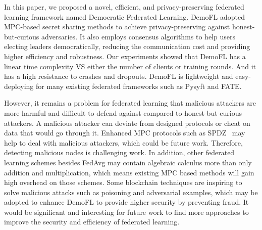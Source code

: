 In this paper, we proposed a novel, efficient, and privacy-preserving federated learning framework named Democratic Federated Learning. DemoFL adopted MPC-based secret sharing methods to achieve privacy-preserving against honest-but-curious adversaries. It also employs consensus algorithms to help users electing leaders democratically, reducing the communication cost and providing higher efficiency and robustness. Our experiments showed that DemoFL has a linear time complexity VS either the number of clients or training rounds. And it has a high resistance to crashes and dropouts. DemoFL is lightweight and easy-deploying for many existing federated frameworks such as Pysyft and FATE.

However, it remains a problem for federated learning that malicious attackers are more harmful and difficult to defend against compared to honest-but-curious attackers. A malicious attacker can deviate from designed protocols or cheat on data that would go through it. Enhanced MPC protocols such as SPDZ~\cite{SPDZ} may help to deal with malicious attackers, which could be future work. Therefore, detecting malicious nodes is challenging work. In addition, other federated learning schemes besides FedAvg may contain algebraic calculus more than only addition and multiplication, which means existing MPC based methods will gain high overhead on those schemes. Some blockchain techniques are inspiring to solve malicious attacks such as poisoning and adversarial examples, which may be adopted to enhance DemoFL to provide higher security by preventing fraud. It would be significant and interesting for future work to find more approaches to improve the security and efficiency of federated learning.
